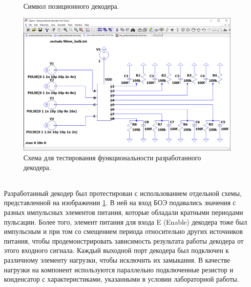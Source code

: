 \begin{figure}[!htb]
\begin{minipage}[b]{0.3\textwidth}
        \caption{Символ позиционного декодера.}
        \label{fig:decoder-symbol}
    \end{minipage}
    \hfill
    \begin{minipage}[b]{0.65\textwidth}
        \centering
        \includegraphics[width=\textwidth]{res/3-to-8-decoder_test-circuit.png}
        \caption{Схема для тестирования функциональности разработанного декодера.}
        \label{fig:decoder-test}
    \end{minipage}
\end{figure}
\\

Разработанный декодер был протестирован с использованием отдельной схемы,
представленной на изображении \ref{fig:decoder-test}. В ней на вход БОЭ
подавались значения с разных импульсных элементов питания, которые обладали
кратными периодами пульсации. Более того, элемент питания для входа E (Enable)
декодера тоже был  импульсным и при том со смещением периода относительно других
источников питания, чтобы продемонстрировать зависимость результата работы
декодера от этого входного сигнала. Каждый выходной порт декодера был подключен
к различному элементу нагрузки, чтобы исключить их замыкания. В качестве
нагрузки на компонент используются параллельно подключенные резистор и
конденсатор с характеристиками, указанными в условии лабораторной работы. 

